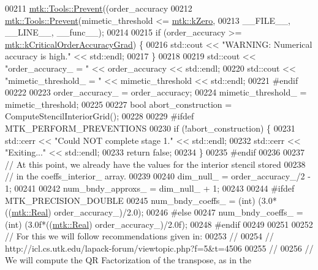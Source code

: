 \begin{DoxyCode}
00211   \hyperlink{classmtk_1_1Tools_a332324c6f25e66be9dff48c5987a3b9f}{mtk::Tools::Prevent}((order\_accuracy%
00212   \hyperlink{classmtk_1_1Tools_a332324c6f25e66be9dff48c5987a3b9f}{mtk::Tools::Prevent}(mimetic\_threshold <= \hyperlink{group__c01-roots_ga59a451a5fae30d59649bcda274fea271}{mtk::kZero},
00213                       \_\_FILE\_\_, \_\_LINE\_\_, \_\_func\_\_);
00214 
00215   \textcolor{keywordflow}{if} (order\_accuracy >= \hyperlink{group__c01-roots_ga295dd2f403c775ecd942c22b5a777496}{mtk::kCriticalOrderAccuracyGrad}) \{
00216     std::cout << \textcolor{stringliteral}{"WARNING: Numerical accuracy is high."} << std::endl;
00217   \}
00218 
00219   std::cout << \textcolor{stringliteral}{"order\_accuracy\_ = "} << order\_accuracy << std::endl;
00220   std::cout << \textcolor{stringliteral}{"mimetic\_threshold\_ = "} << mimetic\_threshold << std::endl;
00221 \textcolor{preprocessor}{  #endif}
00222 
00223   order\_accuracy\_ = order\_accuracy;
00224   mimetic\_threshold\_ = mimetic\_threshold;
00225 
00227   \textcolor{keywordtype}{bool} abort\_construction = ComputeStencilInteriorGrid();
00228 
00229 \textcolor{preprocessor}{  #ifdef MTK\_PERFORM\_PREVENTIONS}
00230   \textcolor{keywordflow}{if} (!abort\_construction) \{
00231     std::cerr << \textcolor{stringliteral}{"Could NOT complete stage 1."} << std::endl;
00232     std::cerr << \textcolor{stringliteral}{"Exiting..."} << std::endl;
00233     \textcolor{keywordflow}{return} \textcolor{keyword}{false};
00234   \}
00235 \textcolor{preprocessor}{  #endif}
00236 
00237   \textcolor{comment}{// At this point, we already have the values for the interior stencil stored}
00238   \textcolor{comment}{// in the coeffs\_interior\_ array.}
00239 
00240   dim\_null\_ = order\_accuracy\_/2 - 1;
00241 
00242   num\_bndy\_approxs\_ = dim\_null\_ + 1;
00243 
00244 \textcolor{preprocessor}{  #ifdef MTK\_PRECISION\_DOUBLE}
00245   num\_bndy\_coeffs\_ = (int) (3.0*((\hyperlink{group__c01-roots_gac080bbbf5cbb5502c9f00405f894857d}{mtk::Real}) order\_accuracy\_)/2.0);
00246 \textcolor{preprocessor}{  #else}
00247   num\_bndy\_coeffs\_ = (int) (3.0f*((\hyperlink{group__c01-roots_gac080bbbf5cbb5502c9f00405f894857d}{mtk::Real}) order\_accuracy\_)/2.0f);
00248 \textcolor{preprocessor}{  #endif}
00249 
00251 
00252   \textcolor{comment}{// For this we will follow recommendations given in:}
00253   \textcolor{comment}{//}
00254   \textcolor{comment}{// http://icl.cs.utk.edu/lapack-forum/viewtopic.php?f=5&t=4506}
00255   \textcolor{comment}{//}
00256   \textcolor{comment}{// We will compute the QR Factorization of the transpose, as in the}

\end{DoxyCode}
